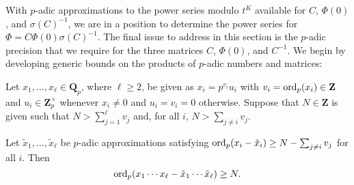 With $p$-adic approximations to the power series modulo $t^K$ available 
for $C$, $\Phi(0)$, and $\sigma(C)^{-1}$, we are in a position to determine 
the power series for $\Phi = C \Phi(0) \sigma(C)^{-1}$.  The final issue 
to address in this section is the $p$-adic precision that we require for 
the three matrices $C$, $\Phi(0)$, and $C^{-1}$.
We begin by developing generic bounds on the products of $p$-adic numbers 
and matrices:

\begin{prop} \label{prop:productval}
Let $x_1, \dotsc, x_{\ell} \in \mathbf{Q}_p$, where $\ell \geq 2$, 
be given as $x_i = p^{v_i} u_i$ with $v_i = \operatorname{ord}_p(x_i) \in \mathbf{Z}$ 
and $u_i \in \mathbf{Z}_p^{\times}$ whenever $x_i \neq 0$ and 
$u_i = v_i = 0$ otherwise.  Suppose that $N \in \mathbf{Z}$ is given 
such that $N > \sum_{j=1}^{\ell} v_j$ and, for all $i$, $N > \sum_{j \neq i} v_j$.

Let $\tilde{x}_1, \dotsc, \tilde{x}_{\ell}$ be $p$-adic approximations 
satisfying $\operatorname{ord}_p(x_i - \tilde{x}_i) \geq N - \sum_{j \neq i} v_j$ 
for all $i$.  Then 
\begin{equation*}
\operatorname{ord}_p(x_1 \dotsm x_{\ell} - \tilde{x}_1 \dotsm \tilde{x}_{\ell}) \geq N.
\end{equation*}
\end{prop}

